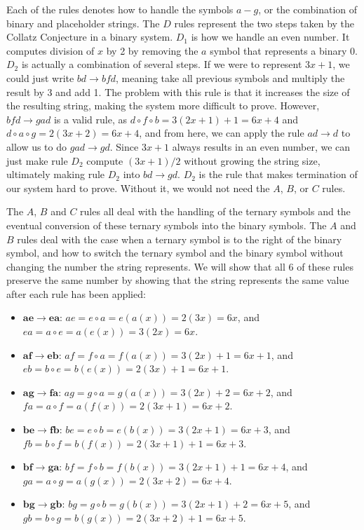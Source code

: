 Each of the rules denotes how to handle the symbols $a-g$, or the combination of binary and placeholder strings. The $D$ rules represent the two steps taken by the Collatz Conjecture in a binary system. $D_1$ is how we handle an even number. It computes division of $x$ by 2 by removing the $a$ symbol that represents a binary 0. $D_2$ is actually a combination of several steps. If we were to represent $3x+1$, we could just write $bd \rightarrow bfd$, meaning take all previous symbols and multiply the result by 3 and add 1. The problem with this rule is that it increases the size of the resulting string, making the system more difficult to prove. However, $bfd \rightarrow gad$ is a valid rule,  as $d \circ f \circ b = 3(2x+1)+1 = 6x+4$ and $d \circ a \circ g = 2(3x+2) = 6x+4$, and from here, we can apply the rule $ad \rightarrow d$ to allow us to do $gad \rightarrow gd$. Since $3x+1$ always results in an even number, we can just make rule $D_2$ compute $(3x+1)/2$ without growing the string size, ultimately making rule $D_2$ into $bd \rightarrow gd$. $D_2$ is the rule that makes termination of our system hard to prove. Without it, we would not need the $A$, $B$, or $C$ rules.\par
The $A$, $B$ and $C$ rules all deal with the handling of the ternary symbols and the eventual conversion of these ternary symbols into the binary symbols. The $A$ and $B$ rules deal with the case when a ternary symbol is to the right of the binary symbol, and how to switch the ternary symbol and the binary symbol without changing the number the string represents. We will show that all 6 of these rules preserve the same number by showing that the string represents the same value after each rule has been applied:
\begin{itemize}
    \item $\boldsymbol{ae \rightarrow ea}$: $ae = e \circ a = e(a(x)) = 2(3x) = 6x$, and $ea = a
    \circ e = a(e(x)) = 3(2x) = 6x$.
    \item $\boldsymbol{af \rightarrow eb}$: $af = f \circ a = f(a(x)) = 3(2x)+1 = 6x+1$, and $eb =
    b \circ e = b(e(x)) = 2(3x)+1 = 6x+1$.
    \item $\boldsymbol{ag \rightarrow fa}$: $ag = g \circ a = g(a(x)) = 3(2x)+2 = 6x+2$, and $fa = a \circ f = a(f(x)) = 2(3x+1) = 6x+2$.
    \item $\boldsymbol{be \rightarrow fb}$: $be = e \circ b = e(b(x)) = 3(2x+1) = 6x+3$, and $fb = b \circ f = b(f(x)) = 2(3x+1)+1 = 6x+3$.
    \item $\boldsymbol{bf \rightarrow ga}$: $bf = f \circ b = f(b(x)) = 3(2x+1)+1 = 6x+4$, and $ga =  a \circ g = a(g(x)) = 2(3x+2) = 6x+4$.
    \item $\boldsymbol{bg \rightarrow gb}$: $bg = g \circ b = g(b(x)) = 3(2x+1)+2 = 6x+5$, and $gb = b \circ g = b(g(x)) = 2(3x+2)+1 = 6x+5$.
\end{itemize}
